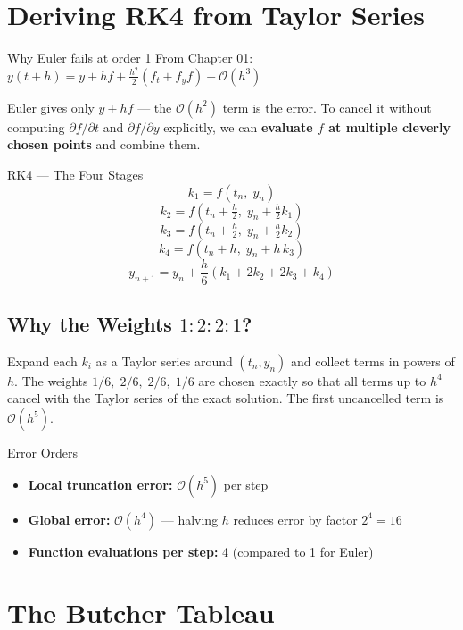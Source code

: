 \documentclass[12pt, a4paper]{article}
\begin{document}
\section{Deriving RK4 from Taylor Series}

\begin{theorybox}{Why Euler fails at order 1}
From Chapter 01: $y(t+h) = y + h f + \frac{h^2}{2}(f_t + f_y f) + \mathcal{O}(h^3)$

Euler gives only $y + hf$ — the $\mathcal{O}(h^2)$ term is the error.
To cancel it without computing $\partial f/\partial t$ and $\partial f/\partial y$ explicitly,
we can \textbf{evaluate $f$ at multiple cleverly chosen points} and combine them.
\end{theorybox}

\begin{theorybox}{RK4 — The Four Stages}
\[
  k_1 = f(t_n,\; y_n)
\]
\[
  k_2 = f\!\left(t_n + \tfrac{h}{2},\; y_n + \tfrac{h}{2}k_1\right)
\]
\[
  k_3 = f\!\left(t_n + \tfrac{h}{2},\; y_n + \tfrac{h}{2}k_2\right)
\]
\[
  k_4 = f\!\left(t_n + h,\; y_n + h\,k_3\right)
\]
\[
  \boxed{y_{n+1} = y_n + \frac{h}{6}(k_1 + 2k_2 + 2k_3 + k_4)}
\]
\end{theorybox}

\subsection*{Why the Weights $1:2:2:1$?}

Expand each $k_i$ as a Taylor series around $(t_n, y_n)$ and collect terms in powers of $h$.
The weights $1/6,\; 2/6,\; 2/6,\; 1/6$ are chosen exactly so that all terms up to $h^4$ cancel with the Taylor series of the exact solution. The first uncancelled term is $\mathcal{O}(h^5)$.

\begin{theorybox}{Error Orders}
\begin{itemize}
  \item \textbf{Local truncation error:} $\mathcal{O}(h^5)$ per step
  \item \textbf{Global error:} $\mathcal{O}(h^4)$ — halving $h$ reduces error by factor $2^4 = 16$
  \item \textbf{Function evaluations per step:} 4 (compared to 1 for Euler)
\end{itemize}
\end{theorybox}

\section{The Butcher Tableau}
\end{document}

